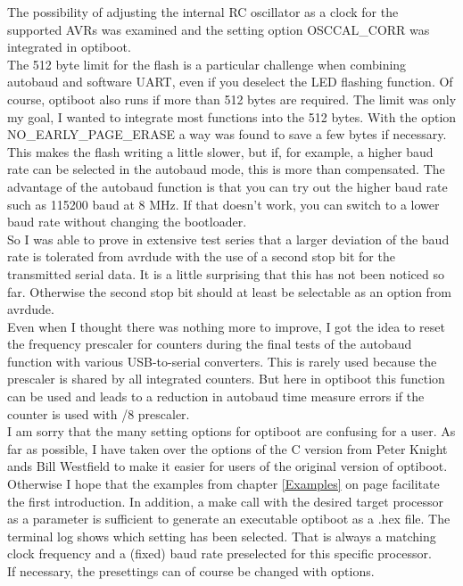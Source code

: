 The possibility of adjusting the internal RC oscillator as a clock for the supported AVRs was examined
and the setting option OSCCAL\_CORR was integrated in optiboot.\\

The 512 byte limit for the flash is a particular challenge when combining autobaud and software UART,
even if you deselect the LED flashing function.
Of course, optiboot also runs if more than 512 bytes are required.
The limit was only my goal, I wanted to integrate most functions into the 512 bytes.
With the option NO\_EARLY\_PAGE\_ERASE a way was found to save a few bytes if necessary.
This makes the flash writing a little slower, but if, for example,
a higher baud rate can be selected in the autobaud mode, this is more than compensated.
The advantage of the autobaud function is that you can try out the higher baud rate such as 115200 baud at 8 MHz.
If that doesn't work, you can switch to a lower baud rate without changing the bootloader.\\

So I was able to prove in extensive test series that a larger deviation of the baud rate is tolerated
from avrdude with the use of a second stop bit for the transmitted serial data.
It is a little surprising that this has not been noticed so far.
Otherwise the second stop bit should at least be selectable as an option from avrdude.\\

Even when I thought there was nothing more to improve, I got the idea to reset the frequency prescaler
for counters during the final tests of the autobaud function with various USB-to-serial converters.
This is rarely used because the prescaler is shared by all integrated counters.
But here in optiboot this function can be used and leads to a reduction in autobaud time measure errors
if the counter is used with /8 prescaler.\\

I am sorry that the many setting options for optiboot are confusing for a user.
As far as possible, I have taken over the options of the C version from Peter Knight ands
Bill Westfield to make it easier for users of the original version of optiboot.
Otherwise I hope that the examples from chapter \ref{Examples} on page \pageref{Examples} facilitate the first introduction.
In addition, a make call with the desired target processor as a parameter is sufficient
to generate an executable optiboot as a .hex file.
The terminal log shows which setting has been selected.
That is always a matching clock frequency and a (fixed) baud rate preselected for this specific processor.\\
If necessary, the presettings can of course be changed with options.

